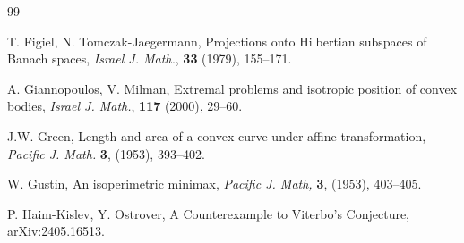 \documentclass[12pt]{amsart}
\theoremstyle{definition}
\newcommand{\CC}{{\mathbb C}}
\begin{document}
\begin{thebibliography} {99}



 T. Figiel, N. Tomczak-Jaegermann,  Projections onto Hilbertian subspaces of Banach spaces, {\em Israel J. Math.}, \textbf{33} (1979), 155--171.


 A. Giannopoulos, V. Milman, Extremal problems and isotropic position of convex bodies, {\it Israel J. Math.}, \textbf{117} (2000), 29--60.





 J.W. Green, Length and area of a convex curve under affine transformation, {\it Pacific J. Math.} \textbf{3}, (1953), 393--402. 

 W. Gustin, An isoperimetric minimax, {\it Pacific J. Math,} \textbf{3}, (1953), 403--405. 




 P. Haim-Kislev, Y. Ostrover, A Counterexample to Viterbo's Conjecture, arXiv:2405.16513.






\end{thebibliography}
\end{document}

